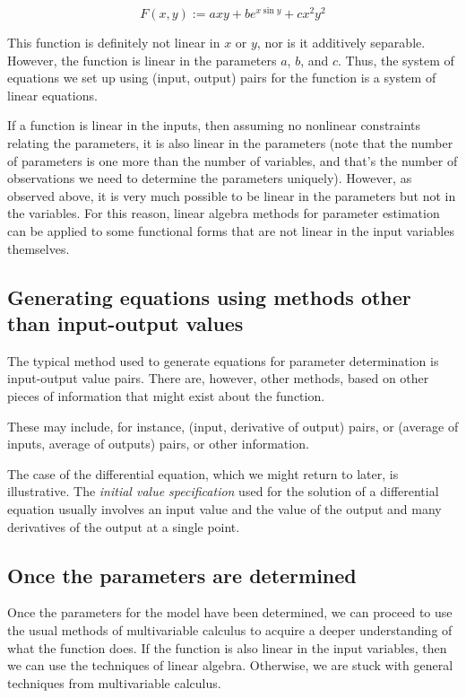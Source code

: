 \documentclass[10pt]{amsart}
\begin{document}
$$F(x,y) := axy + be^{x \sin y} + cx^2y^2$$

This function is definitely not linear in $x$ or $y$, nor is it
additively separable. However, the function is linear in the
parameters $a$, $b$, and $c$. Thus, the system of equations we set up
using (input, output) pairs for the function is a system of linear
equations.

If a function is linear in the inputs, then assuming no nonlinear
constraints relating the parameters, it is also linear in the
parameters (note that the number of parameters is one more than the
number of variables, and that's the number of observations we need to
determine the parameters uniquely). However, as observed above, it is
very much possible to be linear in the parameters but not in the
variables. For this reason, linear algebra methods for parameter
estimation can be applied to some functional forms that are not linear
in the input variables themselves.

\subsection{Generating equations using methods other than input-output values}

The typical method used to generate equations for parameter
determination is input-output value pairs. There are, however, other
methods, based on other pieces of information that might exist about
the function.

These may include, for instance, (input, derivative of output) pairs,
or (average of inputs, average of outputs) pairs, or other
information.

The case of the differential equation, which we might return to later,
is illustrative. The {\em initial value specification} used for the
solution of a differential equation usually involves an input value
and the value of the output and many derivatives of the output at a
single point.

\subsection{Once the parameters are determined}

Once the parameters for the model have been determined, we can proceed
to use the usual methods of multivariable calculus to acquire a deeper
understanding of what the function does. If the function is also
linear in the input variables, then we can use the techniques of
linear algebra. Otherwise, we are stuck with general techniques from
multivariable calculus.
\end{document}
